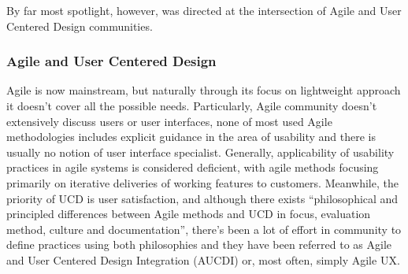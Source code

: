 \documentclass{article}
\begin{document}
By far most spotlight, however, was directed at the intersection of Agile and User Centered Design communities.

\subsubsection{Agile and User Centered Design}
Agile is now mainstream, but naturally through its focus on lightweight approach it doesn't cover all the possible needs. Particularly, Agile community doesn't extensively discuss users or user interfaces, none of most used Agile methodologies includes explicit guidance in the area of usability and there is usually no notion of user interface specialist. Generally, applicability of usability practices in agile systems is considered deficient, with agile methods focusing primarily on iterative deliveries of working features to customers. Meanwhile, the priority of UCD is user satisfaction, and although there exists ``philosophical and principled differences between Agile methods and UCD in focus, evaluation method, culture and documentation'', there's been a lot of effort in community to define practices using both philosophies and they have been referred to as Agile and User Centered Design Integration (AUCDI) or, most often, simply Agile UX. \cite{salah2014systematic}\cite{jurca2014integrating}
\end{document}
